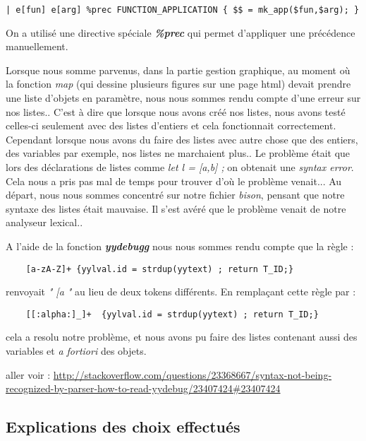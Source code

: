 \documentclass{article}
\begin{document}
\begin{verbatim}
| e[fun] e[arg] %prec FUNCTION_APPLICATION { $$ = mk_app($fun,$arg); }
\end{verbatim}	

	
On a utilisé une directive spéciale \textbf{\emph{\%prec}} qui permet d'appliquer une précédence manuellement.
	

	
	
	
	
	
	

	Lorsque nous somme parvenus, dans la partie gestion graphique, au moment où la fonction \emph{map} (qui dessine plusieurs figures sur une page html) devait prendre une liste d'objets en paramètre, nous nous sommes rendu compte d'une erreur sur nos listes.. C'est à dire que lorsque nous avons créé nos listes, nous avons testé celles-ci seulement avec des listes d'entiers et cela fonctionnait correctement. Cependant lorsque nous avons du faire des listes avec autre chose que des entiers, des variables par exemple, nos listes ne marchaient plus.. Le problème était que lors des déclarations de listes comme \emph{let l = [a,b] ;} on obtenait une \emph{syntax error}. Cela nous a pris pas mal de temps pour trouver d'où le problème venait...  Au départ, nous nous sommes concentré sur notre fichier \emph{bison}, pensant que notre syntaxe des listes était mauvaise. Il s'est avéré que le problème venait de notre analyseur lexical..
	
	
\bigskip
A l'aide de la fonction \textbf{\emph{yydebugg}} nous nous sommes rendu compte que la règle :
\begin{verbatim}
	[a-zA-Z]+ {yylval.id = strdup(yytext) ; return T_ID;}	
\end{verbatim}
renvoyait \emph{" [a "} au lieu de deux tokens différents. 
\bigskip
En remplaçant cette règle par :
\begin{verbatim}
	[[:alpha:]_]+  {yylval.id = strdup(yytext) ; return T_ID;} 
\end{verbatim}
cela a resolu notre problème, et nous avons pu faire des listes contenant aussi des variables et \emph{a fortiori} des objets.
	
\bigskip	
 aller voir : \url{http://stackoverflow.com/questions/23368667/syntax-not-being-recognized-by-parser-how-to-read-yydebug/23407424#23407424}


\subsection{Explications des choix effectués}
\end{document}
